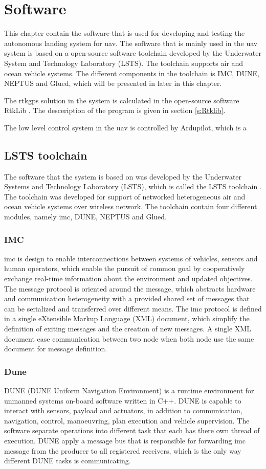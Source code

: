 \chapter{Software}
This chapter contain the software that is used for developing and testing the autonomous landing system for uav. The software that is mainly used in the uav system is based on a open-source software toolchain developed by the Underwater System and Technology Laboratory (LSTS). The toolchain supports air and ocean vehicle systems. The different components in the toolchain is IMC, DUNE, NEPTUS and Glued, which will be presented in later in this chapter. 

The rtkgps solution in the system is calculated in the open-source software RtkLib \citep{takasu2009development}. The desceription of the program is given in section \ref{s:Rtklib}.

The low level control system in the uav is controlled by Ardupilot, which is a 
\section{LSTS toolchain}
The software that the system is based on was developed by the Underwater Systems and Technology Laboratory (LSTS), which is called the LSTS toolchain \citep{pinto2013lsts}. The toolchain was developed for support of networked heterogeneous air and ocean vehicle systems over wireless network. The toolchain contain four different modules, namely \gls{imc}, DUNE, NEPTUS and Glued.
\subsection{IMC}
\gls{imc} \citep{martins2009imc} is design to enable interconnections between systems of vehicles, sensors and human operators, which enable the pursuit of common goal by cooperatively exchange real-time information about the environment and updated objectives. The message protocol is oriented around the message, which abstracts hardware and communication heterogeneity with a provided shared set of messages that can be serialized and transferred over different means. The \gls{imc} protocol is defined in a single eXtensible Markup Language (XML) document, which simplify the definition of exiting messages and the creation of new messages. A single XML document ease communication between two node when both node use the same document for message definition. 
\subsection{Dune}
DUNE (DUNE Uniform Navigation Environment) is a runtime environment for unmanned systems on-board software written in C++. DUNE is capable to interact with sensors, payload and actuators, in addition to communication, navigation, control, manoeuvring, plan execution and vehicle supervision. The software separate operations into different task that each has there own thread of execution. DUNE apply a message bus that is responsible for forwarding \gls{imc} message from the producer to all registered receivers, which is the only way different DUNE tasks is communicating. 

